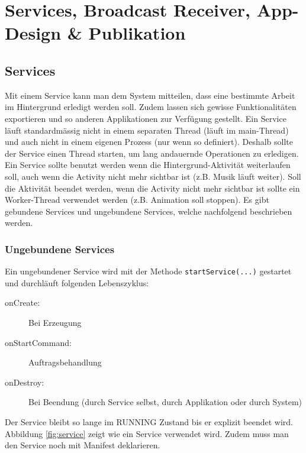 \chapter{Services, Broadcast Receiver, App- Design \& Publikation}

\section{Services}

Mit einem Service kann man dem System mitteilen, dass eine bestimmte Arbeit im Hintergrund erledigt werden soll. Zudem lassen sich gewisse Funktionalitäten exportieren und so anderen Applikationen zur Verfügung gestellt. Ein Service läuft standardmässig nicht in einem separaten Thread (läuft im main-Thread) und auch nicht in einem eigenen Prozess (nur wenn so definiert). Deshalb sollte der Service einen Thread starten, um lang andauernde Operationen zu erledigen. Ein Service sollte benutzt werden wenn die Hintergrund-Aktivität weiterlaufen soll, auch wenn die Activity nicht mehr sichtbar ist (z.B. Musik läuft weiter). Soll die Aktivität beendet werden, wenn die Activity nicht mehr sichtbar ist sollte ein Worker-Thread verwendet werden (z.B. Animation soll stoppen). Es gibt gebundene Services und ungebundene Services, welche nachfolgend beschrieben werden.

\subsection{Ungebundene Services}

Ein ungebundener Service wird mit der Methode \texttt{startService(...)} gestartet und durchläuft folgenden Lebenszyklus:
\begin{description}
	\item[onCreate:] Bei Erzeugung
	\item[onStartCommand:] Auftragsbehandlung
	\item[onDestroy:] Bei Beendung (durch Service selbst, durch Applikation oder durch System)
\end{description}
Der Service bleibt so lange im RUNNING Zustand bis er explizit beendet wird. Abbildung \ref{fig:service} zeigt wie ein Service verwendet wird. Zudem muss man den Service noch mit Manifest deklarieren. 

